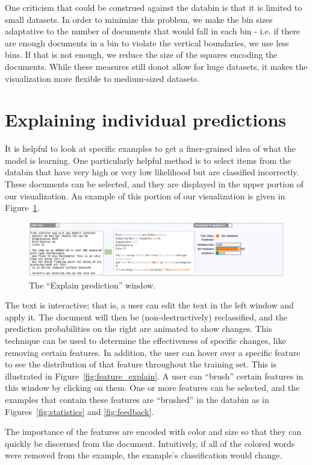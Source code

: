 \documentclass{chi2009}
\begin{document}
One criticism that could be construed against the databin is that it is limited
to small datasets. In order to minimize this problem, we make the bin sizes
adaptative to the number of documents that would fall in each bin - i.e. if
there are enough documents in a bin to violate the vertical boundaries, we use
less bins. If that is not enough, we reduce the size of the squares encoding the
documents. While these measures still donot allow for huge datasets, it makes the
visualization more flexible to medium-sized datasets.

\section{Explaining individual predictions}
It is helpful to look at specific examples to get a finer-grained idea of what
the model is learning. One particularly helpful method is to select items from
the databin that have very high or very low likelihood but are classified
incorrectly. These documents can be selected, and they are displayed in the
upper portion of our visualization. An example of this portion of our
visualization is given in Figure~\ref{fig:explain_pred}.

\begin{figure}
  \includegraphics[width=.5\textwidth]{explain_pred}
  \caption{The ``Explain prediction'' window.}
  \label{fig:explain_pred}
\end{figure}

The text is interactive; that is, a user can edit the text in the left window
and apply it. The document will then be (non-destructively) reclassified, and
the prediction probabilities on the right are animated to show changes. This
technique can be used to determine the effectiveness of specific changes, like
removing certain features. In addition, the user can hover over a specific
feature to see the distribution of that feature throughout the training set.
This is illustrated in Figure~\ref{fig:feature_explain}. A user can ``brush''
certain features in this window by clicking on them. One or more features can be
selected, and the examples that contain these features are ``brushed'' in the
databin as in Figures~\ref{fig:statistics} and \ref{fig:feedback}.

The importance of the features are encoded with color and size so that they can
quickly be discerned from the document. Intuitively, if all of the colored words
were removed from the example, the example's classification would change.
\end{document}
